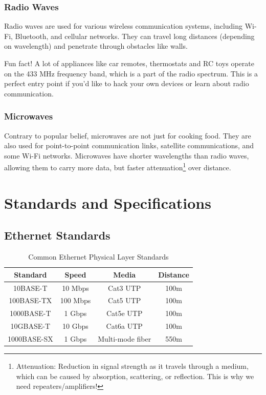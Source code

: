 \subsubsection*{Radio Waves}
Radio waves are used for various wireless communication systems, including Wi-Fi, Bluetooth, and cellular networks. They can travel long distances (depending on wavelength) and penetrate through obstacles like walls.

\begin{noteblock}
    Fun fact! A lot of appliances like car remotes, thermostats and RC toys operate on the 433 MHz frequency band, which is a part of the radio spectrum. This is a perfect entry point if you'd like to hack your own devices or learn about radio communication.
\end{noteblock}

\subsubsection*{Microwaves}
Contrary to popular belief, microwaves are not just for cooking food. They are also used for point-to-point communication links, satellite communications, and some Wi-Fi networks. Microwaves have shorter wavelengths than radio waves, allowing them to carry more data, but faster attenuation\footnote{
    Attenuation: Reduction in signal strength as it travels through a medium, which can be caused by absorption, scattering, or reflection. 
    This is why we need repeaters/amplifiers!
} over distance.

\section{Standards and Specifications}
\subsection*{Ethernet Standards}
\begin{table}[h]
    \centering
    \begin{tabular}{|c|c|c|c|}
        \hline
        \textbf{Standard} & \textbf{Speed} & \textbf{Media} & \textbf{Distance} \\
        \hline
        10BASE-T & 10 Mbps & Cat3 UTP & 100m \\
        100BASE-TX & 100 Mbps & Cat5 UTP & 100m \\
        1000BASE-T & 1 Gbps & Cat5e UTP & 100m \\
        10GBASE-T & 10 Gbps & Cat6a UTP & 100m \\
        1000BASE-SX & 1 Gbps & Multi-mode fiber & 550m \\
        \hline
    \end{tabular}
    \caption{Common Ethernet Physical Layer Standards}\label{tab:ethernet_standards}
\end{table}

